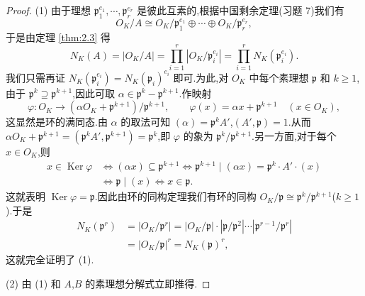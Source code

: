 \begin{proof}
(1) 由于理想 $\mathfrak{p}_1^{e_1},\cdots,\mathfrak{p}_r^{e_r}$ 是彼此互素的,根据中国剩余定理(习题 7)我们有
\[
  O_K/A\cong O_K/\mathfrak{p}_1^{e_1}\oplus\cdots\oplus O_K/\mathfrak{p}_r^{e_r},
\]
于是由定理 \ref{thm:2.3} 得
\[
  N_K(A)=|O_K/A|=\prod_{i=1}^{r}|O_K/\mathfrak{p}_i^{e_i}|=\prod_{i=1}^{r}N_K(\mathfrak{p}_i^{e_i}).
\]
我们只需再证 $N_K(\mathfrak{p}_i^{e_i})=N_K(\mathfrak{p}_i)^{e_i}$ 即可.为此,对 $O_K$ 中每个素理想 $\mathfrak{p}$ 和 $k\geqslant 1$,由于 $\mathfrak{p}^k\supseteq\mathfrak{p}^{k+1}$,因此可取 $\alpha\in\mathfrak{p}^k-\mathfrak{p}^{k+1}$.作映射
\[
  \varphi\colon O_K\to(\alpha O_K+\mathfrak{p}^{k+1})/\mathfrak{p}^{k+1},\qquad
  \varphi(x)=\alpha x+\mathfrak{p}^{k+1}\quad (x\in O_K),
\]
这显然是环的满同态.由 $\alpha$ 的取法可知 $(\alpha)=\mathfrak{p}^kA'$,$(A',\mathfrak{p})=1$.从而 $\alpha O_K+\mathfrak{p}^{k+1}=(\mathfrak{p}^kA',\mathfrak{p}^{k+1})=\mathfrak{p}^k$,即 $\varphi$ 的象为 $\mathfrak{p}^k/\mathfrak{p}^{k+1}$.另一方面,对于每个 $x\in O_K$,则
\begin{align*}
  x\in\operatorname{Ker}\varphi
  &\iff(\alpha x)\subseteq\mathfrak{p}^{k+1}\iff\mathfrak{p}^{k+1}\mid(\alpha x)=\mathfrak{p}^k\cdot A'\cdot(x)\\
  &\iff\mathfrak{p}\mid(x)\iff x\in\mathfrak{p}.
\end{align*}
这就表明 $\operatorname{Ker}\varphi=\mathfrak{p}$.因此由环的同构定理我们有环的同构 $O_K/\mathfrak{p}\cong\mathfrak{p}^k/\mathfrak{p}^{k+1}$($k\geqslant 1$).于是
\begin{align*}
  N_K(\mathfrak{p}^r)&=|O_K/\mathfrak{p}^r|
  =|O_K/\mathfrak{p}|\cdot|\mathfrak{p}/\mathfrak{p}^2|\cdots|\mathfrak{p}^{r-1}/\mathfrak{p}^r|\\
  &=|O_K/\mathfrak{p}|^r=N_K(\mathfrak{p})^r,
\end{align*}
这就完全证明了 (1).

(2) 由 (1) 和 $A$,$B$ 的素理想分解式立即推得.


\end{proof}
